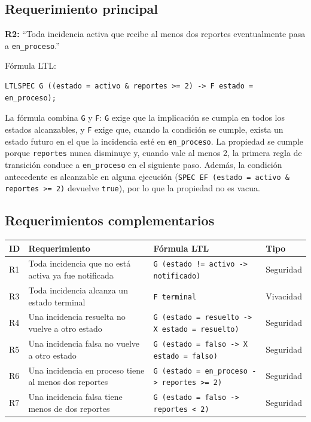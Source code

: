 \documentclass[11pt,a4paper]{article}
\begin{document}
\subsection{Requerimiento principal}

\textbf{R2:} ``Toda incidencia activa que recibe al menos dos reportes eventualmente pasa a \texttt{en\_proceso}.''

Fórmula LTL:

\begin{lstlisting}
LTLSPEC G ((estado = activo & reportes >= 2) -> F estado = en_proceso);
\end{lstlisting}

La fórmula combina \texttt{G} y \texttt{F}: \texttt{G} exige que la implicación se cumpla en todos los estados alcanzables, y \texttt{F} exige que, cuando la condición se cumple, exista un estado futuro en el que la incidencia esté en \texttt{en\_proceso}. La propiedad se cumple porque \texttt{reportes} nunca disminuye y, cuando vale al menos 2, la primera regla de transición conduce a \texttt{en\_proceso} en el siguiente paso. Además, la condición antecedente es alcanzable en alguna ejecución (\texttt{SPEC EF (estado = activo \& reportes >= 2)} devuelve \texttt{true}), por lo que la propiedad no es vacua.

\subsection{Requerimientos complementarios}

\begin{center}
\begin{tabular}{|l|p{5.2cm}|p{5.2cm}|l|}
\hline
\textbf{ID} & \textbf{Requerimiento} & \textbf{Fórmula LTL} & \textbf{Tipo} \\
\hline
R1 & Toda incidencia que no está activa ya fue notificada & \texttt{G (estado != activo -> notificado)} & Seguridad \\
\hline
R3 & Toda incidencia alcanza un estado terminal & \texttt{F terminal} & Vivacidad \\
\hline
R4 & Una incidencia resuelta no vuelve a otro estado & \texttt{G (estado = resuelto -> X estado = resuelto)} & Seguridad \\
\hline
R5 & Una incidencia falsa no vuelve a otro estado & \texttt{G (estado = falso -> X estado = falso)} & Seguridad \\
\hline
R6 & Una incidencia en proceso tiene al menos dos reportes & \texttt{G (estado = en\_proceso -> reportes >= 2)} & Seguridad \\
\hline
R7 & Una incidencia falsa tiene menos de dos reportes & \texttt{G (estado = falso -> reportes < 2)} & Seguridad \\
\hline
\end{tabular}
\end{center}
\end{document}
